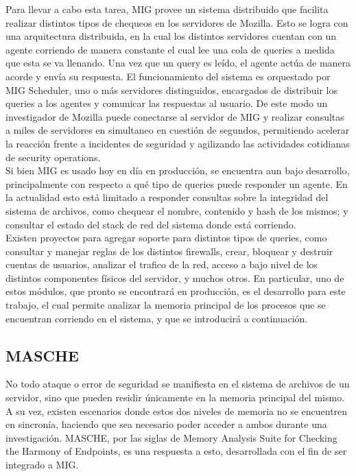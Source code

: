Para llevar a cabo esta tarea, MIG provee un sistema distribuido que facilita
realizar distintos tipos de chequeos en los servidores de Mozilla. Esto se
logra con una arquitectura distribuida, en la cual los distintos servidores
cuentan con un agente corriendo de manera constante el cual lee una cola de
queries a medida que esta se va llenando. Una vez que un
query es leído, el agente actúa de manera acorde y envía su respuesta.
El funcionamiento del sistema es orquestado por MIG Scheduler, uno o
más servidores distinguidos, encargados de distribuir los queries a
los agentes y comunicar las respuestas al usuario. De este modo un investigador
de Mozilla puede conectarse al servidor de MIG y realizar consultas a miles de
servidores en simultaneo en cuestión de segundos, permitiendo acelerar la
reacción frente a incidentes de seguridad y agilizando las actividades
cotidianas de security operations.\\

Si bien MIG es usado hoy en día en producción, se encuentra aun bajo
desarrollo, principalmente con respecto a qué tipo de queries puede
responder un agente. En la actualidad esto está limitado a responder consultas
sobre la integridad del sistema de archivos, como chequear el nombre, contenido
y hash de los mismos; y consultar el estado del stack de red del sistema donde
está corriendo.\\

Existen proyectos para agregar soporte para distintos tipos de queries, como
consultar y manejar reglas de los distintos firewalls, crear, bloquear y
destruir cuentas de usuarios, analizar el trafico de la red, acceso a bajo
nivel de los distintos componentes físicos del servidor, y muchos otros. En
particular, uno de estos módulos, que pronto se encontrará en producción, es el
desarrollo para este trabajo, el cual permite analizar la memoria principal de
los procesos que se encuentran corriendo en el sistema, y que se introducirá a
continuación.\\

\subsection{MASCHE}

No todo ataque o error de seguridad se manifiesta en el sistema de archivos de
un servidor, sino que pueden residir únicamente en la memoria principal del
mismo. A su vez, existen escenarios donde estos dos niveles de memoria no se
encuentren en sincronía, haciendo que sea necesario poder acceder a ambos
durante una investigación. MASCHE, por las siglas de Memory Analysis Suite for
Checking the Harmony of Endpoints, es una respuesta a esto, desarrollada con el
fin de ser integrado a MIG.\\

